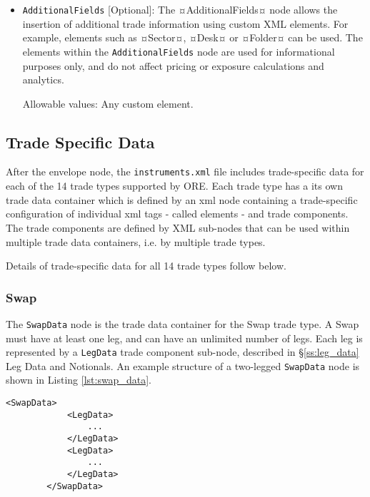 \begin{itemize}
\item \lstinline!AdditionalFields! [Optional]: The ¤AdditionalFields¤ node allows the insertion of additional trade information using custom XML elements.  For example, elements such as ¤Sector¤, ¤Desk¤ or ¤Folder¤ can be used. The elements within the \lstinline!AdditionalFields! node are used for informational purposes only, and do not affect pricing or exposure calculations and analytics.

Allowable values: Any custom element.

\end{itemize}

\subsection{Trade Specific Data}

After the envelope node, the {\tt instruments.xml} file includes trade-specific data for each of the 14 trade types supported by ORE. Each trade type has a its own trade data container which is defined by an xml node containing a trade-specific configuration of individual xml tags - called elements - and trade components. The  trade components are defined by XML sub-nodes that can be used within multiple trade data containers, i.e.  by multiple trade types.

\vspace{1em}

Details of  trade-specific data for all 14 trade types follow below.

\subsubsection{Swap}

The \lstinline!SwapData! node is the trade data container for the Swap trade type. A Swap must have at least one leg, and can have an unlimited number of legs. Each leg is represented by a \lstinline!LegData! trade component sub-node, described in \S \ref{ss:leg_data} Leg Data and Notionals. An example structure of a two-legged \lstinline!SwapData! node  is shown in Listing \ref{lst:swap_data}.

{\footnotesize
\begin{lstlisting}[caption=SwapData, label=lst:swap_data]
			 <SwapData>
            <LegData>
            	...
            </LegData>
            <LegData>
            	...
            </LegData>
        </SwapData>
\end{lstlisting}
}

